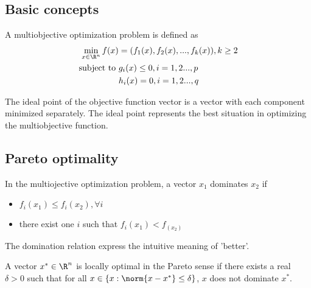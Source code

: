 \begin{refsection}
\subsection{Basic concepts}
\begin{definition}\cite[18]{collette2013multiobjective}
A multiobjective optimization problem is defined as
\begin{align*}
    \min_{x\in \R^n} f(x) &= (f_1(x),f_2(x),...,f_k(x)),k\geq 2\\
    \text{subject to} ~ & g_i(x)\leq 0,i=1,2...,p \\
    & h_i(x)=0,i=1,2...,q
\end{align*}
\end{definition}

\begin{definition}\cite[39]{collette2013multiobjective}
The ideal point of the objective function vector is a vector with each component minimized separately. The ideal point represents the best situation in optimizing the multiobjective function.
\end{definition}


\subsection{Pareto optimality}
\begin{definition}
In the multiojective optimization problem, a vector $x_1$ dominates $x_2$ if
\begin{itemize}
    \item $f_i(x_1) \leq f_i(x_2),\forall i$
    \item there exist one $i$ such that $f_i(x_1) < f_(x_2)$
\end{itemize}
\end{definition}

\begin{remark}
The domination relation express the intuitive meaning of 'better'.
\end{remark}

\begin{definition}\cite[19]{collette2013multiobjective}
A vector $x^*\in \R^n$ is locally optimal in the Pareto sense if there exists a real $\delta > 0$ such that for all $x \in \{x:\norm{x-x^*}\leq \delta\}$, $x$ does not dominate $x^*$.
\end{definition}



\end{refsection}
